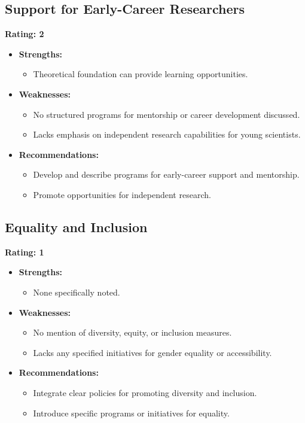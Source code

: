 \documentclass{article}
\begin{document}
\subsection{Support for Early-Career Researchers}
\textbf{Rating: 2}

\begin{itemize}
    \item \textbf{Strengths:} 
    \begin{itemize}
        \item Theoretical foundation can provide learning opportunities.
    \end{itemize}
    \item \textbf{Weaknesses:} 
    \begin{itemize}
        \item No structured programs for mentorship or career development discussed.
        \item Lacks emphasis on independent research capabilities for young scientists.
    \end{itemize}
    \item \textbf{Recommendations:}
    \begin{itemize}
        \item Develop and describe programs for early-career support and mentorship.
        \item Promote opportunities for independent research.
    \end{itemize}
\end{itemize}

\subsection{Equality and Inclusion}
\textbf{Rating: 1}

\begin{itemize}
    \item \textbf{Strengths:} 
    \begin{itemize}
        \item None specifically noted.
    \end{itemize}
    \item \textbf{Weaknesses:} 
    \begin{itemize}
        \item No mention of diversity, equity, or inclusion measures.
        \item Lacks any specified initiatives for gender equality or accessibility.
    \end{itemize}
    \item \textbf{Recommendations:}
    \begin{itemize}
        \item Integrate clear policies for promoting diversity and inclusion.
        \item Introduce specific programs or initiatives for equality.
    \end{itemize}
\end{itemize}
\end{document}
